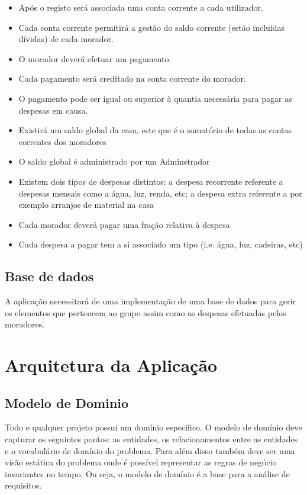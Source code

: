 \begin{itemize}
	
\item{Após o registo será associada uma conta corrente a cada utilizador.}

\item{Cada conta corrente permitirá a gestão do saldo corrente (estão incluidas dívidas) de cada morador.}

\item{O morador deverá efetuar um pagamento.}
 
\item{Cada pagamento será creditado na conta corrente do morador.}
 
 \item{O pagamento pode ser igual ou superior à quantia necessária para pagar as despesas em causa.}
 
 
\item{Existirá um saldo global da casa, este que é o somatório de todas as contas correntes dos moradores}
 
 \item{O saldo global é administrado por um Adminstrador}
 
\item{Existem dois tipos de despesas distintos: a despesa recorrente referente a despesas mensais como a água, luz, renda, etc; a despesa extra referente a por exemplo arranjos de material na casa}
 
\item{Cada morador deverá pagar uma fração relativa à despesa}
 
\item{Cada despesa a pagar tem a si associado um tipo (i.e. água, luz, cadeiras, etc)}

\end{itemize}


\section{Base de dados }
A aplicação necessitará de uma implementação de uma base de dados para gerir os elementos que pertencem ao grupo assim como as despesas efetuadas pelos moradores. 

\chapter{Arquitetura da Aplicação}

\section{Modelo de Dominio }
Todo e qualquer projeto possui um domínio específico. O modelo de domínio deve capturar os seguintes pontos: as entidades, os relacionamentos entre as entidades e o vocabulário de domínio do problema. Para além disso também deve ser uma visão estática do problema onde é possível representar as regras de negócio invariantes no tempo. Ou seja, o modelo de domínio é a base para a análise de requisitos.

